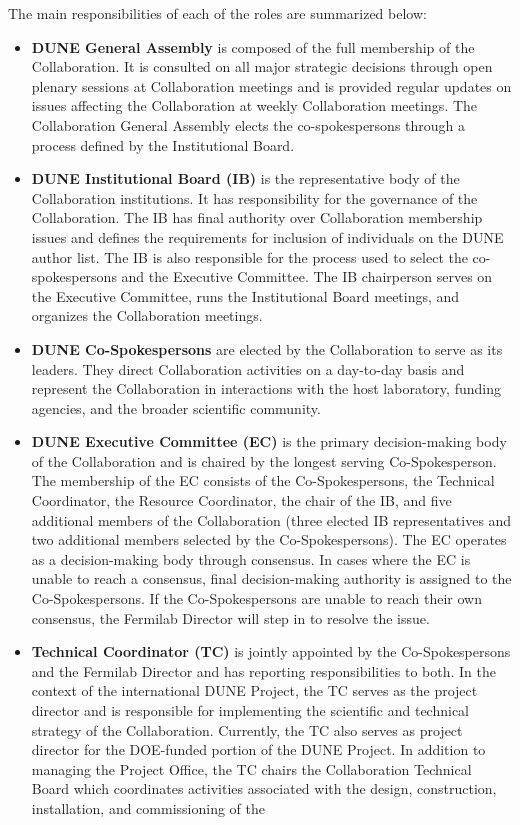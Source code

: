 The main responsibilities of each of the roles are summarized below:
\begin{itemize}
 \item \textbf{DUNE General Assembly} is composed of the full membership of the Collaboration.  It is consulted on all major strategic decisions through open plenary sessions at Collaboration meetings and is provided regular updates on issues affecting the Collaboration at weekly Collaboration meetings.  The Collaboration General Assembly elects the co-spokespersons through a process defined by the Institutional Board.
\item \textbf{DUNE Institutional Board (IB)} is the representative body of the Collaboration institutions. It has responsibility for the governance of the Collaboration. The IB has final authority over Collaboration membership issues and defines the requirements for inclusion of individuals on the DUNE author list. The IB is also responsible for the process used to select the co-spokespersons and the Executive Committee.  The IB chairperson serves on the Executive Committee, runs the Institutional Board meetings, and organizes the Collaboration meetings.
\item \textbf{DUNE Co-Spokespersons} are elected by the Collaboration to serve as its leaders.  They direct Collaboration activities on a day-to-day basis and represent the Collaboration in interactions with the host laboratory, funding agencies, and the broader scientific community.
\item \textbf{DUNE Executive Committee (EC)} is the primary decision-making body of the Collaboration and is chaired by the longest serving Co-Spokesperson.  The membership of the EC consists of the Co-Spokespersons, the Technical Coordinator, the Resource Coordinator, the chair of the IB, and five additional members of the Collaboration (three elected IB representatives and two additional members selected by the Co-Spokespersons).  The EC operates as a decision-making body through consensus.  In cases where the EC is unable to reach a consensus, final decision-making authority is assigned to the Co-Spokespersons.  If the Co-Spokespersons are unable to reach their own consensus, the Fermilab Director will step in to resolve the issue.
\item \textbf{Technical Coordinator (TC)} is jointly appointed by the Co-Spokespersons and the Fermilab Director and has reporting responsibilities to both.  In the context of the international DUNE Project, the TC serves as the project director 
and is responsible for implementing the scientific and technical strategy of the Collaboration.  Currently, the TC also serves as project director for the DOE-funded portion of the DUNE Project.  In addition to managing the Project Office, the TC chairs the Collaboration Technical Board which coordinates activities associated with the design, construction, installation, and commissioning of the %

\end{itemize}
